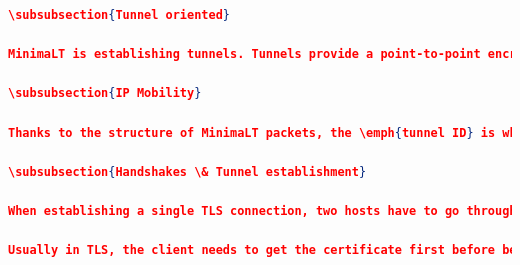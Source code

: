 \documentclass{vldb}
\begin{document}
\begin{lstlisting}[language=json,firstnumber=1]
\subsubsection{Tunnel oriented}

MinimaLT is establishing tunnels. Tunnels provide a point-to-point encrypted channel to transmit information and have the interesting property of being more resistant to traffic analysis, just like IPSec. Tunnels mean that unlike TLS, all services from the transport layer, namely authentication, encryption, congestion control and reliability, are provided for a per tunnel basis and are not repeated per connection. MinimaLT clients have one or more connections for each of the tunnels.

\subsubsection{IP Mobility}

Thanks to the structure of MinimaLT packets, the \emph{tunnel ID} is what identifies what packet belongs to what connection and therefore, MinimaLT has complete IP mobility. Unlike TCP, the source IP address and UDP port can change without affecting the connection. A specific RPC (\emph{$\text{nextTid}_{0}$}) exists to announce an IP address change. A change in IP address will cause a rekeying, a procedure that we describe a little further. The fact that we have IP mobility is a big advantage over TCP that currently struggles in the mobile world when switching from a WiFi connection to a 3G signal for instance. Instead of struggling with multi-path TCP specifications we should just adopt MinimaLT that solves way more than just that issue! 

\subsubsection{Handshakes \& Tunnel establishment}

When establishing a single TLS connection, two hosts have to go through a TCP three-way handshake and then can start the TLS handshake which requires 4 more RTT. Thankfully MinimaLT attempts to fix that and does perform, in most cases, a cryptographic handshake in \emph{less time than unencrypted TCP}! It's also important to note that handshakes with MinimaLT are way less frequent than in TLS because of the tunnel architecture.

Usually in TLS, the client needs to get the certificate first before being able to send encrypted data but with MinimaLT+Namecoin, we already have an ephemeral key that allows us to send encrypted data to the server. Let's see how this key exchange works.


\end{lstlisting}
\end{document}
